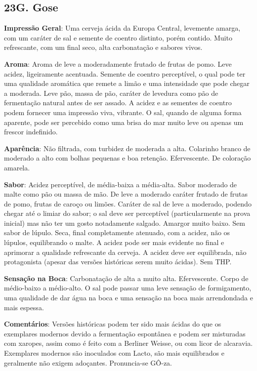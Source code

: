 \subsection*{23G. Gose}
\textbf{Impressão Geral}: Uma cerveja ácida da Europa Central, levemente amarga, com um caráter de sal e semente de coentro distinto, porém contido. Muito refrescante, com um final seco, alta carbonatação e sabores vivos.

\textbf{Aroma}: Aroma de leve a moderadamente frutado de frutas de pomo. Leve acidez, ligeiramente acentuada. Semente de coentro perceptível, o qual pode ter uma qualidade aromática que remete a limão e uma intensidade que pode chegar a moderada. Leve pão, massa de pão, caráter de levedura como pão de fermentação natural antes de ser assado. A acidez e as sementes de coentro podem fornecer uma impressão viva, vibrante. O sal, quando de alguma forma aparente, pode ser percebido como uma brisa do mar muito leve ou apenas um frescor indefinido.

\textbf{Aparência}: Não filtrada, com turbidez de moderada a alta. Colarinho branco de moderado a alto com bolhas pequenas e boa retenção. Efervescente. De coloração amarela.

\textbf{Sabor}: Acidez perceptível, de média-baixa a média-alta. Sabor moderado de malte como pão ou massa de mão. De leve a moderado caráter frutado de frutas de pomo, frutas de caroço ou limões. Caráter de sal de leve a moderado, podendo chegar até o limiar do sabor; o sal deve ser perceptível (particularmente na prova inicial) mas não ter um gosto notadamente salgado. Amargor muito baixo. Sem sabor de lúpulo. Seca, final completamente atenuado, com a acidez, não  os lúpulos, equilibrando o malte. A acidez pode ser mais evidente no final e aprimorar a qualidade refrescante da cerveja. A acidez deve ser equilibrada, não protagonista (apesar das versões históricas serem muito ácidas). Sem THP.

\textbf{Sensação na Boca}: Carbonatação de alta a muito alta. Efervescente. Corpo de médio-baixo a médio-alto. O sal pode passar uma leve sensação de formigamento, uma qualidade de dar água na boca e uma sensação na boca mais arrendondada e mais espessa.

\textbf{Comentários}: Versões históricas podem ter sido mais ácidas do que os exemplares modernos devido a fermentação espontânea e podem ser misturadas com xaropes, assim como é feito com a Berliner Weisse, ou com licor de alcaravia. Exemplares modernos são inoculados com Lacto, são mais equilibrados e geralmente não exigem adoçantes. Pronuncia-se GÔ-za.

